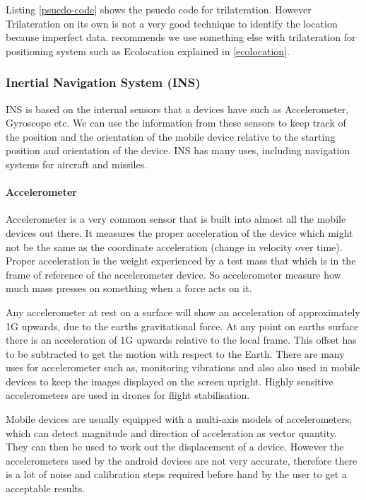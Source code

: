 Listing \ref{psuedo-code} shows the psuedo code for trilateration. However Trilateration on its own is not a very good technique to identify the location because imperfect data. \citeauthor{trilat-fusion} recommends we use something else with trilateration for positioning system\cite{trilat-fusion}  such as Ecolocation explained in \ref{ecolocation}.
\subsubsection{Inertial Navigation System (INS)}

INS\cite{innertial_nav_sys} is based on the internal sensors that a devices have
such as Accelerometer, Gyroscope etc. We can use the information from
these sensors to keep track of the position and the orientation of
the mobile device relative to the starting position and orientation
of the device. INS has many uses, including navigation systems for
aircraft and missiles\cite{ins-wiki}.


\paragraph{Accelerometer} \label{accelerometer}

Accelerometer\cite{accl-guide} is a very common sensor that is built into almost
all the mobile devices out there. It measures the proper acceleration
of the device which might not be the same as the coordinate acceleration
(change in velocity over time). Proper acceleration is the weight
experienced by a test mass that which is in the frame of reference
of the accelerometer device. So accelerometer measure how much mass
presses on something when a force acts on it.

Any accelerometer at rest on a surface will show an acceleration of
approximately 1G upwards\cite{accl-wiki}, due to the earths gravitational force. At
any point on earths surface there is an acceleration of 1G upwards
relative to the local frame. This offset has to be subtracted to get
the motion with respect to the Earth. There are many uses for accelerometer such as,
monitoring vibrations and also also used in mobile devices to
keep the images displayed on the screen upright. Highly sensitive
accelerometers are used in drones for flight stabilisation.

Mobile devices are usually equipped with a multi-axis models of accelerometers,
which can detect magnitude and direction of acceleration as
vector quantity. They can then be used to work out the displacement
of a device. However the accelerometers used by the android devices
are not very accurate, therefore there is a lot of noise and calibration
steps required before hand by the user to get a acceptable results.


